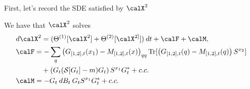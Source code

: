 \documentclass[11pt]{amsart}
\begin{document}
First, let's record the SDE satisfied by $\calX^{2}$
\begin{proposition}
We have that $\calX^{2}$ solves
\begin{align*}
&d\calX^{2} = (\Theta^{(1)}[\calX^{2}] + \Theta^{(2)}[\calX^{2]}])\:dt+ \calF + \calM,\\
&\begin{aligned}
\calF &=   - \sum_{q} \left( G_{[1,2],t }(x_1) - M_{[1,2],t}(x) \right)_{qq} \Tr[\left( G_{[1,2],t}(q) - M_{[1,2],t}(q) \right)S^{x_2}]\\
&\quad + \left(G_t (\calS[G_t] - m) G_t   \right) S^{x_1} G_t^{*} + c.c.\\
\calM &=  - G_t \: dB_t \: G_t S^{x_1} G_t^{*} + c.c.
\end{aligned}
\end{align*}
\end{proposition}
\end{document}
